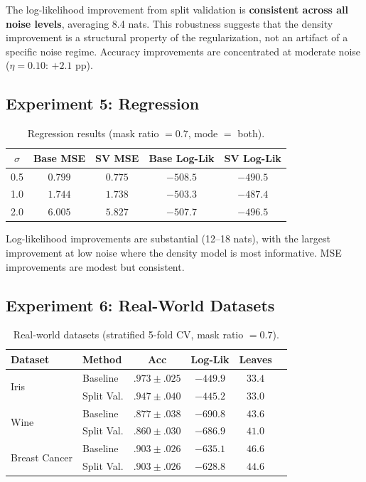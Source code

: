 \documentclass[11pt,a4paper]{article}
\begin{document}
The log-likelihood improvement from split validation is \textbf{consistent
across all noise levels}, averaging 8.4 nats. This robustness suggests
that the density improvement is a structural property of the regularization,
not an artifact of a specific noise regime. Accuracy improvements are
concentrated at moderate noise ($\eta = 0.10$: $+2.1$ pp).

\subsection{Experiment 5: Regression}

\begin{table}[h]
\centering
\caption{Regression results (mask ratio $= 0.7$, mode $=$ both).}
\label{tab:exp5}
\begin{tabular}{ccccc}
\toprule
$\sigma$ & Base MSE & SV MSE & Base Log-Lik & SV Log-Lik \\
\midrule
0.5 & $0.799$ & $0.775$ & $-508.5$ & $\mathbf{-490.5}$ \\
1.0 & $1.744$ & $1.738$ & $-503.3$ & $\mathbf{-487.4}$ \\
2.0 & $6.005$ & $5.827$ & $-507.7$ & $\mathbf{-496.5}$ \\
\bottomrule
\end{tabular}
\end{table}

Log-likelihood improvements are substantial (12--18 nats), with the largest
improvement at low noise where the density model is most informative.
MSE improvements are modest but consistent.

\subsection{Experiment 6: Real-World Datasets}

\begin{table}[h]
\centering
\caption{Real-world datasets (stratified 5-fold CV, mask ratio $= 0.7$).}
\label{tab:exp6}
\begin{tabular}{llcccc}
\toprule
Dataset & Method & Acc & Log-Lik & Leaves \\
\midrule
\multirow{2}{*}{Iris} & Baseline & $.973 \pm .025$ & $-449.9$ & $33.4$ \\
 & Split Val. & $.947 \pm .040$ & $-445.2$ & $33.0$ \\
\midrule
\multirow{2}{*}{Wine} & Baseline & $.877 \pm .038$ & $-690.8$ & $43.6$ \\
 & Split Val. & $.860 \pm .030$ & $-686.9$ & $41.0$ \\
\midrule
\multirow{2}{*}{Breast Cancer} & Baseline & $.903 \pm .026$ & $-635.1$ & $46.6$ \\
 & Split Val. & $.903 \pm .026$ & $-628.8$ & $44.6$ \\
\bottomrule
\end{tabular}
\end{table}
\end{document}
